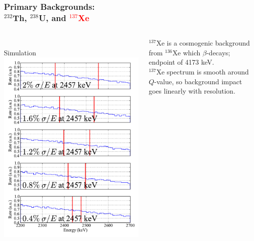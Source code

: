 \documentclass{beamer}
\begin{document}
\begin{frame}
\begin{center}
\frametitle{\hfill Primary Backgrounds:\\\hfill $^{232}$Th, $^{238}$U, and \textcolor{red}{$^{137}$Xe}}
\end{center}
\begin{columns}
\begin{column}{.59\textwidth}
\vspace{-0.5cm}\\%
Simulation\\
\includegraphics[keepaspectratio=true,width=\textwidth]{Xe_Spectra_vs_Res.pdf}
\end{column}
\begin{column}{.41\textwidth}
\vspace{.5cm}%

$^{137}$Xe is a cosmogenic background from $^{136}$Xe which $\beta$-decays; endpoint of 4173 keV.\\[\baselineskip]

$^{137}$Xe spectrum is smooth around $Q$-value, so background impact goes linearly with resolution.

\end{column}
\end{columns}
\end{frame}
\end{document}
